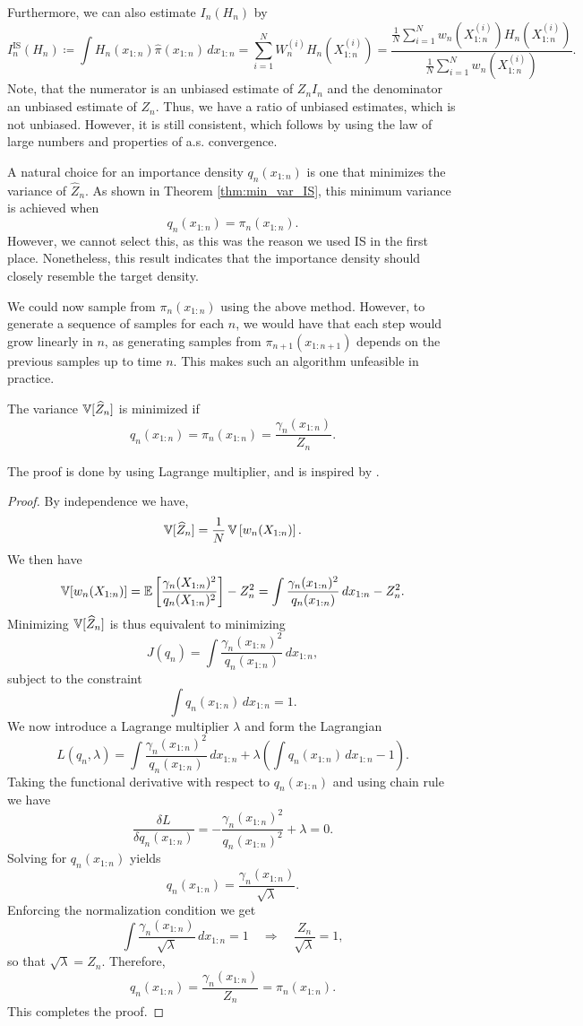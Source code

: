 \noindent Furthermore, we can also estimate $I_n(H_n)$ by
\[
I_n^{\text{IS}}(H_n) \coloneq \int H_n(x_{1:n})\widehat{\pi}(x_{1:n})\, dx_{1:n}=\sum_{i=1}^N W_n^{(i)}H_n(X_{1:n}^{(i)})=\frac{\frac{1}{N}\sum_{i=1}^{N}w_n(X_{1:n}^{(i)})H_n(X_{1:n}^{(i)})}{\frac{1}{N}\sum_{i=1}^{N}w_n(X_{1:n}^{(i)})}.
\]
Note, that the numerator is an unbiased estimate of $Z_nI_n$ and the denominator an unbiased estimate of $Z_n$. Thus, we have a ratio of unbiased estimates, which is not unbiased. However, it is still consistent, which follows by using the law of large numbers and properties of a.s. convergence. 


A natural choice for an importance density $q_n(x_{1:n})$ is one that minimizes the variance of $\widehat{Z}_n$. As shown in Theorem \ref{thm:min_var_IS}, this minimum variance is achieved when
\[
q_n(x_{1:n})=\pi_n(x_{1:n}).
\]
However, we cannot select this, as this was the reason we used IS in the first place. Nonetheless, this result indicates that the importance density should closely resemble the target density.

We could now sample from $\pi_n(x_{1:n})$ using the above method. However, to generate a sequence of samples for each $n$, we would have that each step would grow linearly in $n$, as generating samples from $\pi_{n+1}(x_{1:n+1})$ depends on the previous samples up to time $n$. This makes such an algorithm unfeasible in practice. 

\begin{theorem}
	\label{thm:min_var_IS}
	The variance \(\operatorname{\mathbb{V}}[\widehat{Z}_n]\) is minimized if
	\[
	q_n(x_{1:n}) = \pi_n(x_{1:n}) = \frac{\gamma_n(x_{1:n})}{Z_n}.
	\]
\end{theorem}
The proof is done by using Lagrange multiplier, and is inspired by \cite{min_var_IS}.
\begin{proof}
	By independence we have, 
	\[
		\operatorname{\mathbb{V}}[\widehat{Z}_n] = \frac{1}{N}\operatorname{\mathbb{V}}\left[w_n(X_{1:n})\right].
	\]
	We then have   
	\[
		\operatorname{\mathbb{V}}[w_n(X_{1:n})] = \mathbb{E}\left[\frac{\gamma_n(X_{1:n})^2}{q_n(X_{1:n})^2}\right] - Z_n^2
		= \int \frac{\gamma_n(x_{1:n})^2}{q_n(x_{1:n})}\, dx_{1:n} - Z_n^2.
	\]
	Minimizing \(\operatorname{\mathbb{V}}[\widehat{Z}_n]\) is thus equivalent to minimizing
	\[
		J(q_n) = \int \frac{\gamma_n(x_{1:n})^2}{q_n(x_{1:n})}\, dx_{1:n},
	\]
	subject to the constraint
	\[
		\int q_n(x_{1:n})\, dx_{1:n} = 1.
	\]
	We now introduce a Lagrange multiplier \(\lambda\) and form the Lagrangian
	\[
		L(q_n, \lambda) = \int \frac{\gamma_n(x_{1:n})^2}{q_n(x_{1:n})}\, dx_{1:n} 
		+ \lambda \left(\int q_n(x_{1:n})\, dx_{1:n} - 1\right).
	\]
	Taking the functional derivative with respect to \(q_n(x_{1:n})\) and using chain rule we have
	\[
		\frac{\delta L}{\delta q_n(x_{1:n})} = -\frac{\gamma_n(x_{1:n})^2}{q_n(x_{1:n})^2} + \lambda = 0.
	\]
	Solving for \(q_n(x_{1:n})\) yields
	\[
		q_n(x_{1:n}) = \frac{\gamma_n(x_{1:n})}{\sqrt{\lambda}}.
	\]
	Enforcing the normalization condition we get
	\[
		\int \frac{\gamma_n(x_{1:n})}{\sqrt{\lambda}}\, dx_{1:n} = 1 \quad\Longrightarrow\quad \frac{Z_n}{\sqrt{\lambda}} = 1,
	\]
	so that \(\sqrt{\lambda} = Z_n\). Therefore,
	\[
		q_n(x_{1:n}) = \frac{\gamma_n(x_{1:n})}{Z_n} = \pi_n(x_{1:n}).
	\]
	This completes the proof.
\end{proof}
